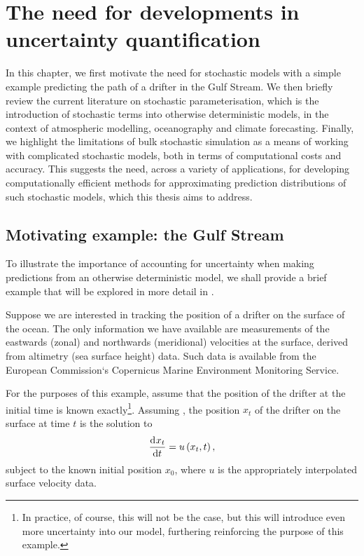 \chapter{The need for developments in uncertainty quantification}
In this chapter, we first motivate the need for stochastic models with a simple example predicting the path of a drifter in the Gulf Stream.
We then briefly review the current literature on stochastic parameterisation, which is the introduction of stochastic terms into otherwise deterministic models, in the context of atmospheric modelling, oceanography and climate forecasting.
Finally, we highlight the limitations of bulk stochastic simulation as a means of working with complicated stochastic models, both in terms of computational costs and accuracy.
This suggests the need, across a variety of applications, for developing computationally efficient methods for approximating prediction distributions of such stochastic models, which this thesis aims to address.



\section{Motivating example: the Gulf Stream}

To illustrate the importance of accounting for uncertainty when making predictions from an otherwise deterministic model, we shall provide a brief example that will be explored in more detail in .

Suppose we are interested in tracking the position of a drifter on the surface of the ocean.
The only information we have available are measurements of the eastwards (zonal) and northwards (meridional) velocities at the surface, derived from altimetry (sea surface height) data.
Such data is available from the European Commission`s Copernicus Marine Environment Monitoring Service.

For the purposes of this example, assume that the position of the drifter at the initial time is known exactly\footnote{In practice, of course, this will not be the case, but this will introduce even more uncertainty into our model, furthering reinforcing the purpose of this example.}.
Assuming , the position \(x_t\) of the drifter on the surface at time \(t\) is the solution to
\[
	\dod{x_t}{t} = u\left(x_t, t\right),
\]
subject to the known initial position \(x_0\), where \(u\) is the appropriately interpolated surface velocity data.

